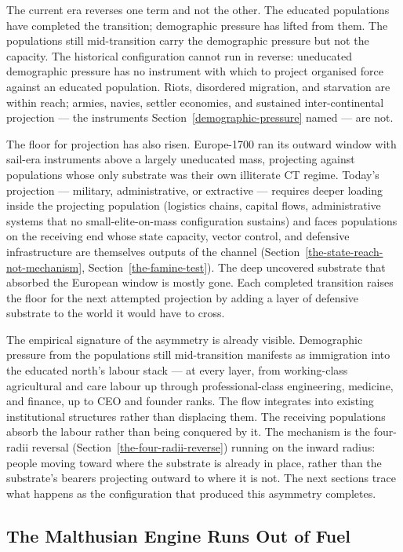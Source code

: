 \documentclass[12pt,letterpaper]{article}
\begin{document}
The current era reverses one term and not the other. The educated
populations have completed the transition; demographic pressure has
lifted from them. The populations still mid-transition carry the
demographic pressure but not the capacity. The historical
configuration cannot run in reverse: uneducated demographic pressure
has no instrument with which to project organised force against an
educated population. Riots, disordered migration, and starvation are
within reach; armies, navies, settler economies, and sustained
inter-continental projection --- the instruments
Section~\ref{demographic-pressure} named --- are not.

The floor for projection has also risen. Europe-1700 ran its outward
window with sail-era instruments above a largely uneducated mass,
projecting against populations whose only substrate was their own
illiterate CT regime. Today's projection --- military, administrative, or
extractive --- requires deeper loading inside the projecting
population (logistics chains, capital flows, administrative systems
that no small-elite-on-mass configuration sustains) and faces
populations on the receiving end whose state capacity, vector
control, and defensive infrastructure are themselves outputs of the
channel (Section~\ref{the-state-reach-not-mechanism},
Section~\ref{the-famine-test}). The deep uncovered substrate that
absorbed the European window is mostly gone. Each completed
transition raises the floor for the next attempted projection by
adding a layer of defensive substrate to the world it would have to
cross.

The empirical signature of the asymmetry is already visible.
Demographic pressure from the populations still mid-transition
manifests as immigration into the educated north's labour stack ---
at every layer, from working-class agricultural and care labour up
through professional-class engineering, medicine, and finance, up to
CEO and founder ranks. The flow integrates into existing institutional
structures rather than displacing them. The receiving populations
absorb the labour rather than being conquered by it. The mechanism is
the four-radii reversal (Section~\ref{the-four-radii-reverse}) running
on the inward radius: people moving toward where the substrate is
already in place, rather than the substrate's bearers projecting
outward to where it is not. The next sections trace what happens as
the configuration that produced this asymmetry completes.

\subsection{The Malthusian Engine Runs Out of Fuel}\label{the-malthusian-engine}
\end{document}
